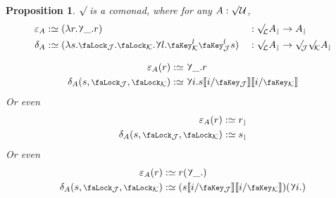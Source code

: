 \documentclass[10pt]{article}
\newtheorem{proposition}[theorem]{Proposition}
\theoremstyle{definition}
\let\oldequiv\equiv%
\renewcommand{\equiv}{\simeq}
\newcommand{\defeq}{\oldequiv}
\newcommand*{\univ}{\mathcal{U}}
\newcommand{\lock}{\mathchoice {\scalebox{0.8}{\text{\faLock}}}
  {\scalebox{0.8}{\text{\faLock}}} {\scalebox{0.5}{\text{\faLock}}}
  {\scalebox{0.4}{\text{\faLock}}} }
\newcommand{\key}{\mathchoice
  {\scalebox{0.8}{\text{\faKey}}} {\scalebox{0.8}{\text{\faKey}}}
  {\scalebox{0.5}{\text{\faKey}}} {\scalebox{0.4}{\text{\faKey}}} }
\newcommand{\rbindsym}{\raisebox{-0.5pt}{\scalerel*{\reflectbox{\rotatebox[origin=c]{185}{$\lambda$}}}{\lambda}}}
\newcommand{\rbind}[1]{\rbindsym{} #1.}
\newcommand{\lockn}[1]{\mathcal{#1}}
\newcommand{\varkeye}[2]{\key_{#1}^{#2}}
\newcommand{\varkey}[2]{\varkeye{\lockn{#1}}{#2}}
\newcommand{\ctxlocke}[1]{\lock_{#1}}
\newcommand{\ctxlock}[1]{\ctxlocke{\lockn{#1}}}
\newcommand{\stubra}[1]{\llbracket #1 \rrbracket}
\newcommand{\substucke}[2]{\stubra{#1/\key_{#2}}}
\newcommand{\substuck}[2]{\substucke{#1}{\lockn{#2}}}
\newcommand{\rforme}[2]{\ThisStyle{\raisebox{0.07em}{$\SavedStyle \surd_{\hspace{-0.25em}#1}$}} #2}
\newcommand{\rform}[2]{\rforme{\lockn{#1}}{#2}}
\newcommand{\rformu}[1]{\ThisStyle{\raisebox{0.07em}{$\SavedStyle \surd$}} #1}
\newcommand{\rintroe}[2]{\lock_{#1}. #2}
\newcommand{\rintro}[2]{\rintroe{\lockn{#1}}{#2}}
\newcommand{\relim}[1]{\rbindsym #1}
\newcommand{\rget}[1]{{#1}_{\downharpoonleft}}
\begin{document}
\begin{proposition}
  $\rform{}$ is a comonad, where for any $A : \rformu \univ$,
  \begin{alignat*}{2}
    \varepsilon_A &:\defeq (\lambda r. \relim{\_.r}) &&: \rform{L} \rget{A} \to \rget{A} \\
    \delta_A &:\defeq (\lambda s. \rintro{J}{\rintro{K}{\relim{l.\varkey{K}{l}\varkey{J}{l}s}}}) &&: \rform{L} \rget{A} \to \rform{J} \rform{K} \rget{A}
  \end{alignat*}

  \begin{align*}
    \varepsilon_A(r)
    &:\defeq \relim{\_.r} \\
    \delta_A(s, \ctxlock{J}, \ctxlock{K})
    &:\defeq \relim{i.s\substuck{i}{J}\substuck{i}{K}}
  \end{align*}
  Or even
  \begin{align*}
    \varepsilon_A(r) &:\defeq \rget{r} \\
    \delta_A(s, \ctxlock{J}, \ctxlock{K}) &:\defeq \rget{s}
  \end{align*}
  Or even
  \begin{align*}
    \varepsilon_A(r) &:\defeq r(\rbind{\_}) \\
    \delta_A(s, \ctxlock{J}, \ctxlock{K}) &:\defeq (s\substuck{i}{J}\substuck{i}{K})(\rbind{i})
  \end{align*}
\end{proposition}
\end{document}
